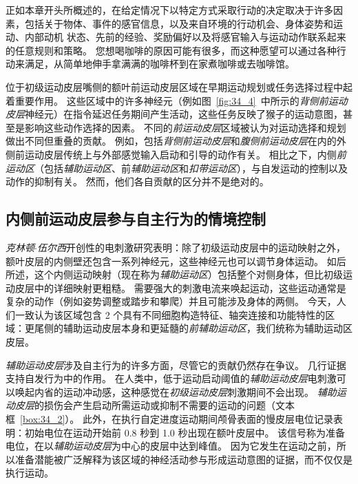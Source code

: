 正如本章开头所概述的，在给定情况下以特定方式采取行动的决定取决于许多因素，包括关于物体、事件的感官信息，以及来自环境的行动机会、身体姿势和运动、内部动机 状态、先前的经验、奖励偏好以及将感官输入与运动动作联系起来的任意规则和策略。
您想喝咖啡的原因可能有很多，而这种愿望可以通过各种行动来满足，从简单地伸手拿满满的咖啡杯到在家煮咖啡或去咖啡馆。


位于初级运动皮层嘴侧的额叶前运动皮层区域在早期运动规划或任务选择过程中起着重要作用。
这些区域中的许多神经元（例如图~\ref{fig:34_4}~中所示的\textit{背侧前运动皮层}神经元）在指令延迟任务期间产生活动，这些任务反映了猴子的运动意图，甚至是影响这些动作选择的因素。
不同的\textit{前运动皮层}区域被认为对运动选择和规划做出不同但重叠的贡献。
例如，包括\textit{背侧前运动皮层}和\textit{腹侧前运动皮层}在内的外侧前运动皮层传统上与外部感觉输入启动和引导的动作有关。
相比之下，内侧\textit{前运动区}（包括\textit{辅助运动区}、前\textit{辅助运动区}和\textit{扣带运动区}），与自发运动的控制以及动作的抑制有关。
然而，他们各自贡献的区分并不是绝对的。



\subsection{内侧前运动皮层参与自主行为的情境控制}

\textit{克林顿$\cdot$伍尔西}开创性的电刺激研究表明：除了初级运动皮层中的运动映射之外，额叶皮层的内侧壁还包含一系列神经元，这些神经元也可以调节身体运动。
如后所述，这个内侧运动映射（现在称为\textit{辅助运动区}）包括整个对侧身体，但比初级运动皮层中的详细映射更粗糙。
需要强大的刺激电流来唤起运动，这些运动通常是复杂的动作（例如姿势调整或踏步和攀爬）并且可能涉及身体的两侧。
今天，人们一致认为该区域包含 2 个具有不同细胞构造特征、轴突连接和功能特性的区域：更尾侧的辅助运动皮层本身和更延髓的\textit{前辅助运动区}，我们统称为辅助运动区皮层。


\textit{辅助运动皮层}涉及自主行为的许多方面，尽管它的贡献仍然存在争议。
几行证据支持自发行为中的作用。
在人类中，低于运动启动阈值的\textit{辅助运动皮层}电刺激可以唤起内省的运动冲动感，这种感觉在\textit{初级运动皮层}刺激期间不会出现。
\textit{辅助运动皮层}的损伤会产生启动所需运动或抑制不需要的运动的问题（文本框~\ref{box:34_2}）。
此外，在执行自定进度运动期间颅骨表面的慢皮层电位记录表明：初始电位在运动开始前 0.8 秒到 1.0 秒出现在额叶皮层中。
该信号称为准备电位，在以\textit{辅助运动皮层}为中心的皮层中达到峰值。
因为它发生在运动之前，所以准备潜能被广泛解释为该区域的神经活动参与形成运动意图的证据，而不仅仅是执行运动。



